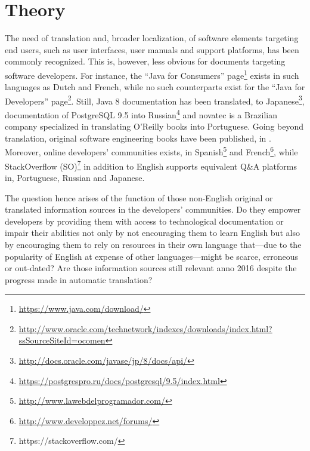 \section{Theory}
The need of translation and, broader localization, of software elements targeting end users, such as user interfaces, user manuals and support platforms, has been commonly recognized. 
This is, however, less obvious for documents targeting software developers.
For instance, the ``Java for Consumers'' page\footnote{\url{https://www.java.com/download/}}
exists in such languages as Dutch and French, while no such counterparts exist for the ``Java for Developers'' page\footnote{\url{http://www.oracle.com/technetwork/indexes/downloads/index.html?ssSourceSiteId=ocomen}}. 
Still, Java 8 documentation has been translated, \eg to Japanese\footnote{\url{http://docs.oracle.com/javase/jp/8/docs/api/}}, documentation of PostgreSQL 9.5 into Russian\footnote{\url{https://postgrespro.ru/docs/postgresql/9.5/index.html}} and novatec is a Brazilian company specialized in translating O'Reilly books into Portuguese.
Going beyond translation, original software engineering books have been published, \eg in . Moreover, online developers' communities exists, \eg in Spanish\footnote{\url{http://www.lawebdelprogramador.com/}} and French\footnote{\url{http://www.developpez.net/forums/}}, while StackOverflow (SO)\footnote{https://stackoverflow.com/} in addition to English supports equivalent Q\&A platforms in, \eg Portuguese, Russian and Japanese. 

The question hence arises of the function of those non-English original or translated information sources in
the developers' communities. 
Do they empower developers by providing them with access to technological documentation or impair their abilities not only by not encouraging them to learn English but also by encouraging them to rely on resources in their own language that---due to the popularity of English at expense of other languages---might be scarce, erroneous or out-dated? 
Are those information sources still relevant anno 2016 despite the progress made in automatic translation? 

